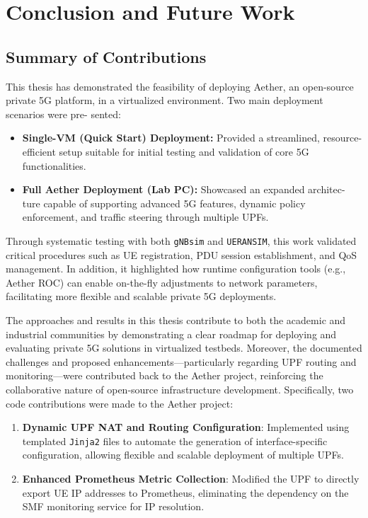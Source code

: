 \chapter{Conclusion and Future Work}
\label{ch:conclusion_futurework}
\section{Summary of Contributions}
This thesis has demonstrated the feasibility of deploying Aether, an open-source private
5G platform, in a virtualized environment. Two main deployment scenarios were pre-
sented:

\begin{itemize}
    \item \textbf{Single-VM (Quick Start) Deployment:} Provided a streamlined, 
    resource-efficient setup suitable for initial testing and validation of core 5G functionalities.
    \item \textbf{Full Aether Deployment (Lab PC):} Showcased an expanded architec-
    ture capable of supporting advanced 5G features, dynamic policy enforcement, 
    and traffic steering through multiple UPFs.
\end{itemize}

Through systematic testing with both \texttt{gNBsim} and \texttt{UERANSIM}, this 
work validated critical procedures such as UE registration, PDU session establishment, 
and QoS management. In addition, it highlighted how runtime configuration tools (e.g., 
Aether ROC) can enable on-the-fly adjustments to network parameters, facilitating more 
flexible and scalable private 5G deployments. 

The approaches and results in this thesis contribute to both the academic and industrial communities by demonstrating a clear roadmap for deploying and evaluating private 5G solutions in virtualized testbeds. Moreover, the documented challenges and proposed enhancements—particularly regarding UPF routing and monitoring—were contributed back to the Aether project, reinforcing the collaborative nature of open-source infrastructure development. 
Specifically, two code contributions were made to the Aether project:

\begin{enumerate}
    \item \textbf{Dynamic UPF NAT and Routing Configuration}: Implemented using templated \texttt{Jinja2} files to automate the generation of interface-specific configuration, allowing flexible and scalable deployment of multiple UPFs.
    
    \item \textbf{Enhanced Prometheus Metric Collection}: Modified the UPF to directly export UE IP addresses to Prometheus, eliminating the dependency on the SMF monitoring service for IP resolution.
\end{enumerate}

